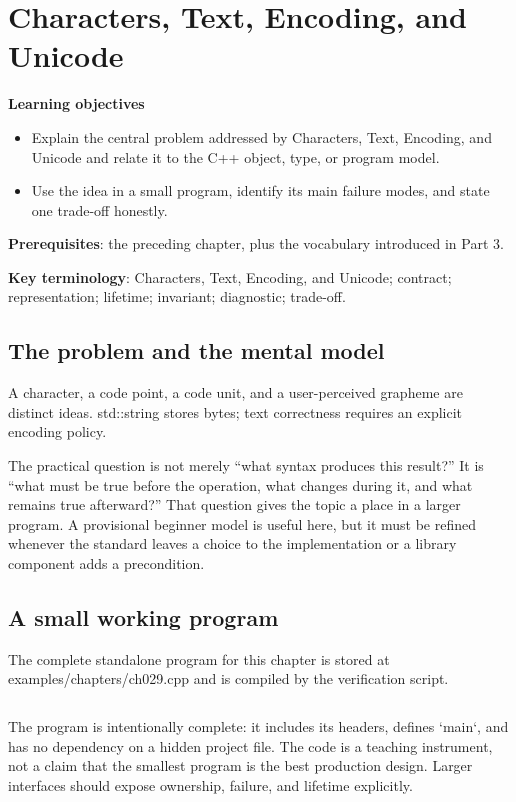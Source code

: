 \chapter{Characters, Text, Encoding, and Unicode}
\begin{chaptermeta}
\textbf{Learning objectives}
\begin{itemize}
  \item Explain the central problem addressed by Characters, Text, Encoding, and Unicode and relate it to the C++ object, type, or program model.
  \item Use the idea in a small program, identify its main failure modes, and state one trade-off honestly.
\end{itemize}
\textbf{Prerequisites}: the preceding chapter, plus the vocabulary introduced in Part 3.

\textbf{Key terminology}: Characters, Text, Encoding, and Unicode; contract; representation; lifetime; invariant; diagnostic; trade-off.
\end{chaptermeta}

\section{The problem and the mental model}
A character, a code point, a code unit, and a user-perceived grapheme are distinct ideas. std::string stores bytes; text correctness requires an explicit encoding policy.

The practical question is not merely “what syntax produces this result?” It is “what must be true before the operation, what changes during it, and what remains true afterward?” That question gives the topic a place in a larger program. A provisional beginner model is useful here, but it must be refined whenever the standard leaves a choice to the implementation or a library component adds a precondition.

\section{A small working program}
The complete standalone program for this chapter is stored at examples/chapters/ch029.cpp and is compiled by the verification script.

\inputminted[fontsize=\scriptsize,breaklines]{cpp}{examples/chapters/ch029.cpp}

The program is intentionally complete: it includes its headers, defines `main`, and has no dependency on a hidden project file. The code is a teaching instrument, not a claim that the smallest program is the best production design. Larger interfaces should expose ownership, failure, and lifetime explicitly.

